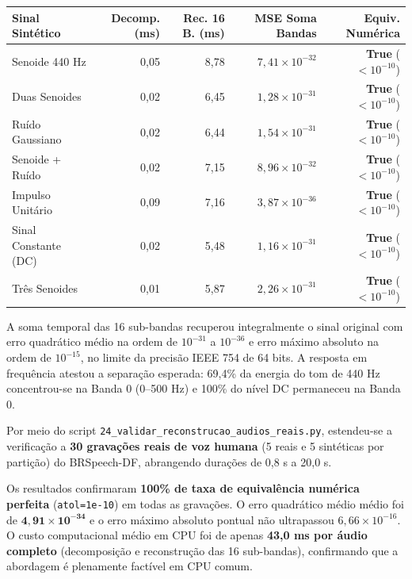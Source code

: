 \documentclass[11pt,a4paper]{article}
\newcommand{\subtitulo}[1]{\vspace{4pt}{\large\bfseries #1}\par\vspace{2pt}}
\begin{document}
\begin{center}\small
\begin{tabular}{lrrrr}\toprule
\textbf{Sinal Sintético} & \textbf{Decomp. (ms)} & \textbf{Rec. 16 B. (ms)} & \textbf{MSE Soma Bandas} & \textbf{Equiv. Numérica}\\\midrule
Senoide 440 Hz & 0,05 & 8,78 & $7,41 \times 10^{-32}$ & \textbf{True} ($<10^{-10}$)\\
Duas Senoides & 0,02 & 6,45 & $1,28 \times 10^{-31}$ & \textbf{True} ($<10^{-10}$)\\
Ruído Gaussiano & 0,02 & 6,44 & $1,54 \times 10^{-31}$ & \textbf{True} ($<10^{-10}$)\\
Senoide + Ruído & 0,02 & 7,15 & $8,96 \times 10^{-32}$ & \textbf{True} ($<10^{-10}$)\\
Impulso Unitário & 0,09 & 7,16 & $3,87 \times 10^{-36}$ & \textbf{True} ($<10^{-10}$)\\
Sinal Constante (DC) & 0,02 & 5,48 & $1,16 \times 10^{-31}$ & \textbf{True} ($<10^{-10}$)\\
Três Senoides & 0,01 & 5,87 & $2,26 \times 10^{-31}$ & \textbf{True} ($<10^{-10}$)\\\bottomrule
\end{tabular}
\end{center}

A soma temporal das 16 sub-bandas recuperou integralmente o sinal original com erro quadrático médio na ordem de $10^{-31}$ a $10^{-36}$ e erro máximo absoluto na ordem de $10^{-15}$, no limite da precisão IEEE 754 de 64 bits. A resposta em frequência atestou a separação esperada: 69,4\% da energia do tom de 440 Hz concentrou-se na Banda 0 (0--500 Hz) e 100\% do nível DC permaneceu na Banda 0.

\subtitulo{2.3 Validação da reconstrução em gravações reais de fala}
Por meio do script \texttt{24\_validar\_reconstrucao\_audios\_reais.py}, estendeu-se a verificação a \textbf{30 gravações reais de voz humana} (5 reais e 5 sintéticas por partição) do BRSpeech-DF, abrangendo durações de 0,8 s a 20,0 s.

Os resultados confirmaram \textbf{100\% de taxa de equivalência numérica perfeita} (\texttt{atol=1e-10}) em todas as gravações. O erro quadrático médio médio foi de $\mathbf{4{,}91\times 10^{-34}}$ e o erro máximo absoluto pontual não ultrapassou $6{,}66\times 10^{-16}$. O custo computacional médio em CPU foi de apenas \textbf{43,0 ms por áudio completo} (decomposição e reconstrução das 16 sub-bandas), confirmando que a abordagem é plenamente factível em CPU comum.
\end{document}
